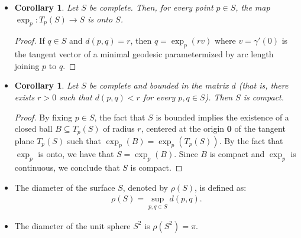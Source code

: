 \documentclass[10pt]{article}
\newtheorem{corollary}[lemma]{Corollary}
\newcommand{\ve}[1]{\mathbf{#1}}
\newcommand{\ra}{\rightarrow}
\newcommand{\sseq}{\subseteq}
\begin{document}
\begin{itemize}
    \item \begin{corollary}
      Let $S$ be complete. Then, for every point $p \in S$, the map $\exp_p : T_p(S) \ra S$ is onto $S$.
    \end{corollary}
    \begin{proof}
      If $q \in S$ and $d(p, q) = r$, then $q = \exp_p(rv)$ where $v = \gamma'(0)$ is the tangent vector of a minimal geodesic parametermized by arc length joining $p$ to $q$.
    \end{proof}

    \item \begin{corollary}
      Let $S$ be complete and bounded in the matrix $d$ (that is, there exists $r > 0$ such that $d(p,q) < r$ for every $p, q \in S$). Then $S$ is compact.
    \end{corollary}
    \begin{proof}
      By fixing $p \in S$, the fact that $S$ is bounded implies the existence of a closed ball $B \sseq T_p(S)$ of radius $r$, centered at the origin $\ve{0}$ of the tangent plane $T_p(S)$ such that $\exp_p(B) = \exp_p(T_p(S)).$ By the fact that $\exp_p$ is onto, we have that $S = \exp_p(B)$. Since $B$ is compact and $\exp_p$ is continuous, we conclude that $S$ is compact.
    \end{proof}

    \item The diameter of the surface $S$, denoted by $\rho(S)$, is defined as:
    \begin{align*}
      \rho(S) = \sup_{p, q \in S} d(p,q).
    \end{align*}

    \item The diameter of the unit sphere $S^2$ is $\rho(S^2) = \pi$.
  \end{itemize}
\end{document}
